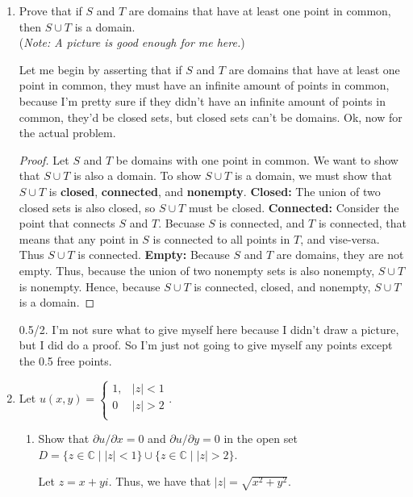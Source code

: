 \begin{enumerate}
	\item Prove that if $S$ and $T$ are domains that have at least one point in common, then $S \cup T$ is a domain.\\
		({\it Note: A picture is good enough for me here.})
		\begin{problem}
			Let me begin by asserting that if $S$ and $T$ are domains that have at least one point in common, they must have an infinite amount of points in common, because I'm pretty sure if they didn't have an infinite amount of points in common, they'd be closed sets, but closed sets can't be domains.\gline{}
			Ok, now for the actual problem.
			\begin{proof}
				Let $S$ and $T$ be domains with one point in common. We want to show that $S \cup T$ is also a domain.\gline{}
				To show $S \cup T$ is a domain, we must show that $S\cup T$ is \textbf{closed}, \textbf{connected}, and \textbf{nonempty}.\gline{}
				\textbf{Closed: }The union of two closed sets is also closed, so $S \cup T$ must be closed.\gline{}
				\textbf{Connected: }Consider the point that connects $S$ and $T$. Becuase $S$ is connected, and $T$ is connected, that means that any point in $S$ is connected to all points in $T$, and vise-versa. Thus $S\cup T$ is connected.\gline{}
				\textbf{Empty: }Because $S$ and $T$ are domains, they are not empty. Thus, because the union of two nonempty sets is also nonempty, $S\cup T$ is nonempty.\gline{}
				Hence, because $S\cup T$ is connected, closed, and nonempty, $S\cup T$ is a domain. 
			\end{proof}
		\end{problem}
		\begin{grade}
			0.5/2. \gline{}
			I'm not sure what to give myself here because I didn't draw a picture, but I did do a proof. So I'm just not going to give myself any points except the 0.5 free points.
		\end{grade}
	\item Let $u(x,y) = 
		\begin{cases}
      	1, & |z| < 1 \\
      	0 & |z| >2 \\
		\end{cases}.$
	\begin{enumerate}
		\item Show that $\partial u/\partial x =0$ and $\partial u/ \partial y = 0$ in the open set $D = \{z \in \mathbb{C} \mid |z| < 1\} \cup \{z \in \mathbb{C} \mid |z|>2\}$.
		\begin{problem}
			Let $z = x+yi$. Thus, we have that $|z| = \sqrt{x^2 + y^2}$. \gline{}

\end{problem}
\end{enumerate}
\end{enumerate}
